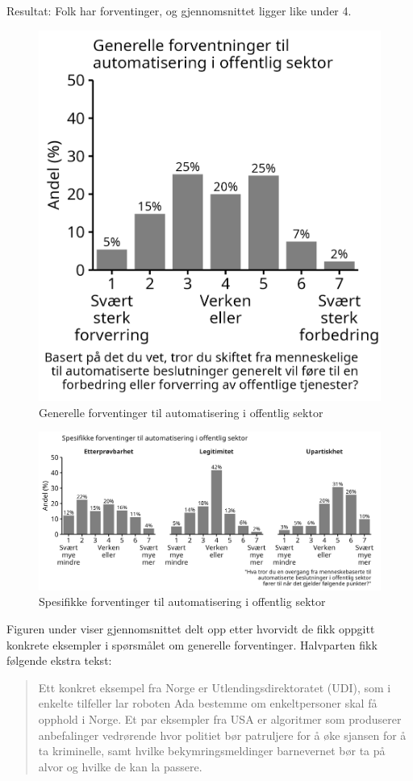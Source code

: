 \documentclass[
  12pt,
  a4paper, 12pt]{article}
\begin{document}
Resultat: Folk har forventinger, og gjennomsnittet ligger like under 4.

\begin{figure}

{\centering \includegraphics[width=0.45\linewidth]{figs/png/fig_automat_hist} 

}

\caption{Generelle forventinger til automatisering i offentlig sektor}\label{fig:unnamed-chunk-20}
\end{figure}

\begin{figure}

{\centering \includegraphics[width=1\linewidth]{figs/png/fig_automat2_hist} 

}

\caption{Spesifikke forventinger til automatisering i offentlig sektor}\label{fig:unnamed-chunk-21}
\end{figure}

Figuren under viser gjennomsnittet delt opp etter hvorvidt de fikk oppgitt konkrete eksempler i spørsmålet om generelle forventinger. Halvparten fikk følgende ekstra tekst:

\begin{quote}
Ett konkret eksempel fra Norge er Utlendingsdirektoratet (UDI), som i enkelte tilfeller lar roboten Ada bestemme om enkeltpersoner skal få opphold i Norge. Et par eksempler fra USA er algoritmer som produserer anbefalinger vedrørende hvor politiet bør patruljere for å øke sjansen for å ta kriminelle, samt hvilke bekymringsmeldinger barnevernet bør ta på alvor og hvilke de kan la passere.
\end{quote}
\end{document}
